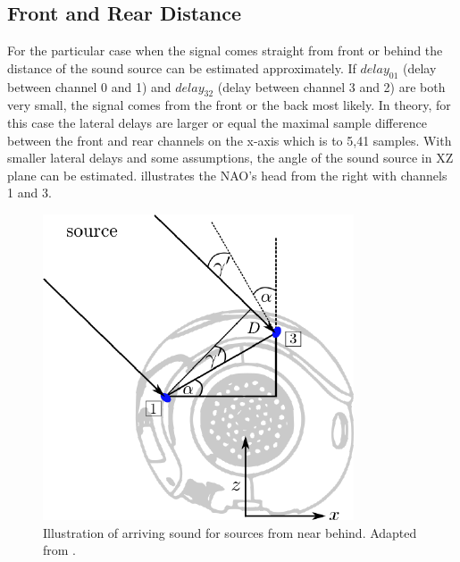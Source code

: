\subsection{Front and Rear Distance}
\label{subsec:03_distance}


For the particular case when the signal comes straight from front or behind
the distance of the sound source can be estimated approximately.
If $delay_{01}$ (delay between channel 0 and 1) and $delay_{32}$ (delay between channel 3 and 2)
are both very small, the signal comes from
the front or the back most likely.
In theory, for this case the lateral delays are larger or equal the maximal
sample difference between the front and rear channels on the x-axis which is
to 5,41 samples.
With smaller lateral delays and some assumptions, the angle of the sound source in XZ
plane can be estimated.
 illustrates the NAO's head from the right with
channels 1 and 3.
\begin{figure}[ht]
	\centering
		\includegraphics[width=0.45\columnwidth]{figures/side_head_tdoa}
    \caption{Illustration of arriving sound for sources from near behind.
             Adapted from \cite{nao_docu}.}
    \label{fig:02_headSideTdoa}
\end{figure}

